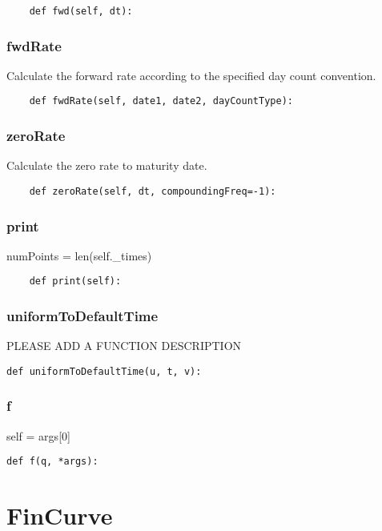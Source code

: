\documentclass[twoside,11pt]{book}
\begin{document}
\begin{lstlisting}
    def fwd(self, dt):
\end{lstlisting}

\subsubsection*{{\bf fwdRate}}
Calculate the forward rate according to the specified day count convention.  

\begin{lstlisting}
    def fwdRate(self, date1, date2, dayCountType):
\end{lstlisting}

\subsubsection*{{\bf zeroRate}}
Calculate the zero rate to maturity date.  

\begin{lstlisting}
    def zeroRate(self, dt, compoundingFreq=-1):
\end{lstlisting}

\subsubsection*{{\bf print}}
numPoints = len(self.\_times) 

\begin{lstlisting}
    def print(self):
\end{lstlisting}

\subsubsection*{{\bf uniformToDefaultTime}}
PLEASE ADD A FUNCTION DESCRIPTION

\begin{lstlisting}
def uniformToDefaultTime(u, t, v):
\end{lstlisting}

\subsubsection*{{\bf f}}
self = args[0] 

\begin{lstlisting}
def f(q, *args):
\end{lstlisting}

\newpage
\section{FinCurve}
\end{document}
